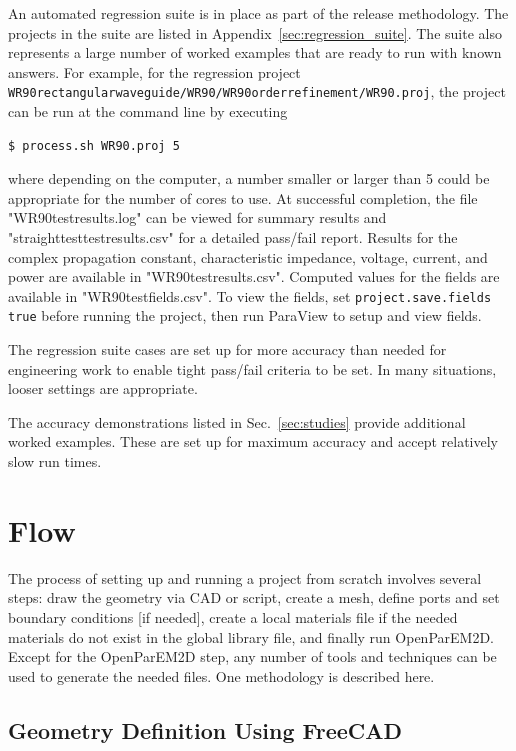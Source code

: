 \documentclass[titlepage]{article}
\renewcommand\_{\textunderscore\linebreak[1]}
\begin{document}
An automated regression suite is in place as part of the release methodology. The projects in the suite are listed in Appendix~\ref{sec:regression_suite}.  The suite also represents a large number of worked examples that are ready to run with known answers.  For example, for the regression project \texttt{WR90\_rectangular\_waveguide/WR90/WR90\_order\_4\_refinement/WR90.proj}, the project can be run at the command line by executing
\begin{Verbatim}[fontsize=\small]
   $ process.sh WR90.proj 5
\end{Verbatim}
where depending on the computer, a number smaller or larger than 5 could be appropriate for the number of cores to use.  At successful completion, the file "WR90\_test\_results.log" can be viewed for summary results and "straight\_test\_test\_results.csv" for a detailed pass/fail report.  Results for the complex propagation constant, characteristic impedance, voltage, current, and power are available in "WR90\_test\_results.csv".  Computed values for the fields are available in "WR90\_test\_fields.csv".  To view the fields, set \verb+project.save.fields true+ before running the project, then run ParaView to setup and view fields.

The regression suite cases are set up for more accuracy than needed for engineering work to enable tight pass/fail criteria to be set.  In many situations, looser settings are appropriate.

The accuracy demonstrations listed in Sec.~\ref{sec:studies} provide additional worked examples.  These are set up for maximum accuracy and accept relatively slow run times.

\section{Flow}

The process of setting up and running a project from scratch involves several steps: draw the geometry via CAD or script, create a mesh, define ports and set boundary conditions [if needed], create a local materials file if the needed materials do not exist in the global library file, and finally run OpenParEM2D.  Except for the OpenParEM2D step, any number of tools and techniques can be used to generate the needed files.  One methodology is described here.

\subsection{Geometry Definition Using FreeCAD}
\label{sec:freecad}
\end{document}

